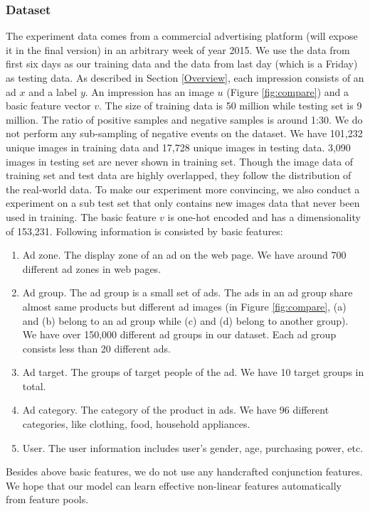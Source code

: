 \documentclass{sig-alternate}
\begin{document}
\subsubsection{Dataset}
The experiment data comes from a commercial advertising platform (will expose it in the final version) in an  arbitrary  week of year 2015. We use the data from first six days as our training data and the data from last day (which is a Friday) as testing data.  As described in Section \ref{Overview}, each impression consists of an ad $x$ and a label $y$.  An impression has an image $u$ (Figure \ref{fig:compare}) and a basic feature vector $v$.  The size of training data is 50 million while testing set is 9 million. The ratio of positive samples and negative samples is around 1:30.   We do not perform any sub-sampling of negative events on the dataset. We have 101,232 unique images in training data and 17,728 unique images in testing data. 3,090 images in testing set are never shown in training set. Though the image data of training set and test data are highly overlapped, they follow the distribution of the real-world data. To make our experiment more convincing, we also conduct a experiment on a sub test set that only contains new images data that never been used in training.  The basic feature $v$ is one-hot encoded and has a dimensionality of 153,231. Following information is consisted by basic features:
\begin{enumerate}
	\item Ad zone. The display zone of an ad on the web page. We have around 700 different ad zones in web pages.
	\item Ad group. The ad group is a small set of ads. The ads in an ad group share almost same  products but different ad images (in Figure \ref{fig:compare}, (a) and (b) belong to an ad group while (c) and (d) belong to another group). We have over 150,000 different ad groups in our dataset. Each ad group consists less than 20 different   ads.
	\item Ad target. The groups of target people of the ad.  We have 10 target groups in total.
	\item Ad category. The category of the product in ads. We have 96 different categories, like clothing, food, household appliances. 
	\item User. The user information includes user's gender, age, purchasing power, etc. 
\end{enumerate}
Besides above basic features, we do not use any handcrafted conjunction features. We hope that  our model can learn  effective non-linear features automatically from feature pools.
\end{document}
